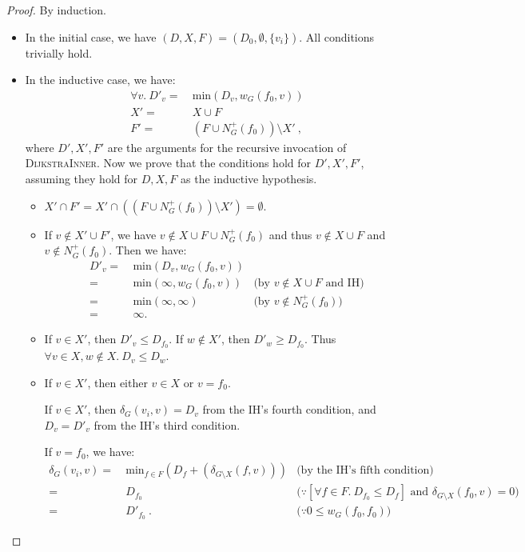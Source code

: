 \documentclass[11pt,a4paper,oneside,microtype,nokorean]{oblivoir}
\begin{document}
\begin{proof}
  By induction.

  \begin{itemize}
  \item In the initial case, we have $(D, X, F) = (D_0, \emptyset, \{v_i\})$.  All conditions trivially hold.
  \item In the inductive case, we have:
    \begin{align*}
      \forall v.~D'_v =&~ \textrm{min}(D_v, w_G(f_0,v)) \\
      X' =&~ X \cup F \\
      F' =&~ (F \cup N^+_G(f_0)) \setminus X'~,
    \end{align*}
    where $D', X', F'$ are the arguments for the recursive invocation of \textsc{DijkstraInner}.
    Now we prove that the conditions hold for $D', X', F'$, assuming they hold for $D, X, F$ as the
    inductive hypothesis.

    \begin{itemize}
    \item $X' \cap F' = X' \cap ((F \cup N^+_G(f_0)) \setminus X') = \emptyset$.

    \item If $v \notin X' \cup F'$, we have $v \notin X \cup F \cup N^+_G(f_0)$ and thus
      $v \notin X \cup F$ and $v \notin N^+_G(f_0)$.  Then we have:
      \begin{align*}
        D'_v
        =&~ \textrm{min}(D_v, w_G(f_0,v)) \\
        =&~ \textrm{min}(\infty, w_G(f_0,v)) & \mbox{(by $v \notin X \cup F$ and IH)} \\
        =&~ \textrm{min}(\infty, \infty) & \mbox{(by $v \notin N^+_G(f_0)$)} \\
        =&~ \infty.
      \end{align*}

    \item If $v \in X'$, then $D'_v \le D_{f_0}$.  If $w \notin X'$, then $D'_w \ge D_{f_0}$.  Thus
      $\forall v\in X, w \notin X.~D_v \le D_w$.

    \item If $v \in X'$, then either $v \in X$ or $v = f_0$.

      If $v \in X'$, then $\delta_G(v_i,v) = D_v$ from the IH's fourth condition, and $D_v = D'_v$
      from the IH's third condition.

      If $v = f_0$, we have:
      \begin{align*}
        \delta_G(v_i,v) =&~ \textrm{min}_{f \in F} (D_f + (\delta_{G \setminus X}(f,v))) & \mbox{(by the IH's
                                                                                           fifth condition)} \\
        =&~ D_{f_0} & \mbox{($\because [\forall f \in F.~D_{f_0} \le D_f]$ and
                      $\delta_{G \setminus X}(f_0,v) = 0$)} \\
        =&~ D'_{f_0}~. & \mbox{($\because 0 \le w_G(f_0,f_0)$)}
      \end{align*}


\end{itemize}
\end{itemize}
\end{proof}
\end{document}
